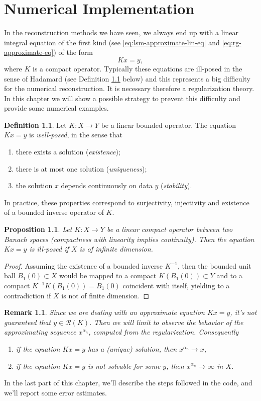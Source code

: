 \documentclass[10pt, a4paper, twoside, openright]{book}
\theoremstyle{definition}
\newtheorem{definition}[subsection]{Definition}
\theoremstyle{plain}
\theoremstyle{plain}
\theoremstyle{plain}
\newtheorem{proposition}[subsection]{Proposition}
\theoremstyle{plain}
\newtheorem{remark}[subsection]{Remark}
\theoremstyle{plain}
\theoremstyle{plain}
\theoremstyle{plain}
\theoremstyle{plain}
\begin{document}
\chapter{Numerical Implementation}
\label{ch:implementation}
In the reconstruction methods we have seen, we always end up with a linear integral equation of the 
first kind (see \eqref{eq:lsm-approximate-lin-eq} and \eqref{eq:rg-approximate-eq}) of the form
\begin{equation}
 Kx = y,\label{eq:first-to-inv}
\end{equation}
where $K$ is a compact operator.
Typically these equations are ill-posed in the sense of Hadamard (see Definition \ref{def:well-posed-lineareq} below) 
and this represents a big difficulty for the numerical reconstruction. It is necessary therefore a regularization 
theory. In this chapter we will show a possible strategy to prevent this difficulty and provide some numerical examples.
\begin{definition}
\label{def:well-posed-lineareq}
 Let $K:X\to Y$ be a linear bounded operator. The equation $Kx=y$ is \emph{well-posed}, in the sense that
 \begin{enumerate}
  \item there exists a solution (\emph{existence});
  \item there is at most one solution (\emph{uniqueness});
  \item the solution $x$ depends continuously on data $y$ (\emph{stability}).
 \end{enumerate}
In practice, these properties correspond to surjectivity, injectivity and existence 
of a bounded inverse operator of $K$.
\end{definition}
\begin{proposition}
\label{prop:ill-posed}
 Let $K:X\to Y$ be a linear compact operator between two Banach spaces (compactness with linearity implies continuity). Then 
 the equation $Kx=y$ is ill-posed if $X$ is of infinite dimension.
\end{proposition}
\begin{proof}
 Assuming the existence of a bounded inverse $K^{-1}$, then the bounded unit ball $B_1(0)\subset X$ would be mapped to 
 a compact $K(B_1(0))\subset Y$ and to a compact $K^{-1}K(B_1(0))=B_1(0)$ coincident with itself, yielding to a contradiction if $X$ is not of finite dimension.
\end{proof}     
\begin{remark}
 Since we are dealing with an approximate equation $Kx=y$, it's not guaranteed that $y\in \mathcal{R}(K)$. 
 Then we will limit to observe the behavior of the approximating sequence $x^{\alpha_n}$, computed from the regularization.
 Consequently
 \begin{enumerate}
  \item if the equation $Kx=y$ has a (unique) solution, then $x^{\alpha_n}\to x$,
  \item if the equation $Kx=y$ is not solvable for some $y$, then $x^{\alpha_n}\to \infty$ in $X$.
 \end{enumerate}
\end{remark}
In the last part of this chapter, we'll describe the steps followed in the code, and we'll report some error estimates.
\end{document}
